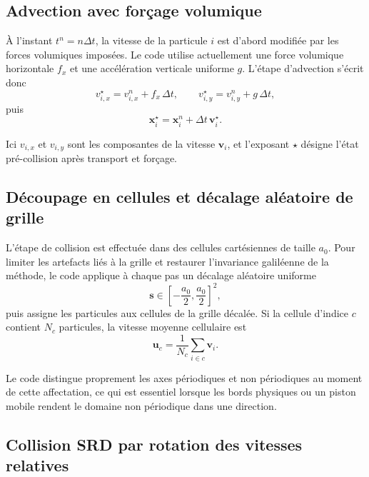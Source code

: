 \documentclass[11pt,a4paper]{article}
\begin{document}
\subsection{Advection avec forçage volumique}

À l'instant $t^n = n\Delta t$, la vitesse de la particule $i$ est d'abord modifiée par les forces volumiques imposées. Le code utilise actuellement une force volumique horizontale $f_x$ et une accélération verticale uniforme $g$. L'étape d'advection s'écrit donc
\begin{equation}
 v_{i,x}^{\star} = v_{i,x}^{n} + f_x\,\Delta t,
 \qquad
 v_{i,y}^{\star} = v_{i,y}^{n} + g\,\Delta t,
\end{equation}
puis
\begin{equation}
 \bm{x}_i^{\star} = \bm{x}_i^{n} + \Delta t\,\bm{v}_i^{\star}.
\end{equation}

Ici $v_{i,x}$ et $v_{i,y}$ sont les composantes de la vitesse $\bm{v}_i$, et l'exposant $\star$ désigne l'état pré-collision après transport et forçage.

\subsection{Découpage en cellules et décalage aléatoire de grille}

L'étape de collision est effectuée dans des cellules cartésiennes de taille $a_0$. Pour limiter les artefacts liés à la grille et restaurer l'invariance galiléenne de la méthode, le code applique à chaque pas un décalage aléatoire uniforme
\begin{equation}
 \bm{s} \in \left[-\frac{a_0}{2},\frac{a_0}{2}\right]^2,
\end{equation}
puis assigne les particules aux cellules de la grille décalée. Si la cellule d'indice $c$ contient $N_c$ particules, la vitesse moyenne cellulaire est
\begin{equation}
 \bm{u}_c = \frac{1}{N_c}\sum_{i\in c} \bm{v}_i.
\end{equation}

Le code distingue proprement les axes périodiques et non périodiques au moment de cette affectation, ce qui est essentiel lorsque les bords physiques ou un piston mobile rendent le domaine non périodique dans une direction.

\subsection{Collision SRD par rotation des vitesses relatives}
\end{document}
